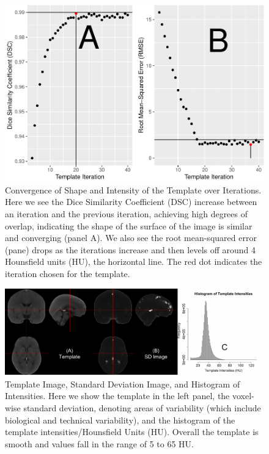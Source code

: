 \documentclass[]{elsarticle} %
\makeatletter
\def\maxwidth{\ifdim\Gin@nat@width>\linewidth\linewidth
\else\Gin@nat@width\fi}
\let\Oldincludegraphics\includegraphics
\renewcommand{\includegraphics}[1]{\Oldincludegraphics[width=\maxwidth]{#1}}
\makeatother
\begin{document}
\begin{figure}
\centering
\includegraphics{index_with_supp_files/figure-latex/performance-1.pdf}
\caption{\label{fig:performance}Convergence of Shape and Intensity of the Template over Iterations. Here we see the Dice Similarity Coefficient (DSC) increase between an iteration and the previous iteration, achieving high degrees of overlap, indicating the shape of the surface of the image is similar and converging (panel A). We also see the root mean-squared error (pane) drops as the iterations increase and then levels off around 4 Hounsfield units (HU), the horizontal line. The red dot indicates the iteration chosen for the template.}
\end{figure}

\begin{figure}
\centering
\includegraphics{index_with_supp_files/figure-latex/template-1.pdf}
\caption{\label{fig:template}Template Image, Standard Deviation Image, and Histogram of Intensities. Here we show the template in the left panel, the voxel-wise standard deviation, denoting areas of variability (which include biological and technical variability), and the histogram of the template intensities/Hounsfield Units (HU). Overall the template is smooth and values fall in the range of 5 to 65 HU.}
\end{figure}
\end{document}
